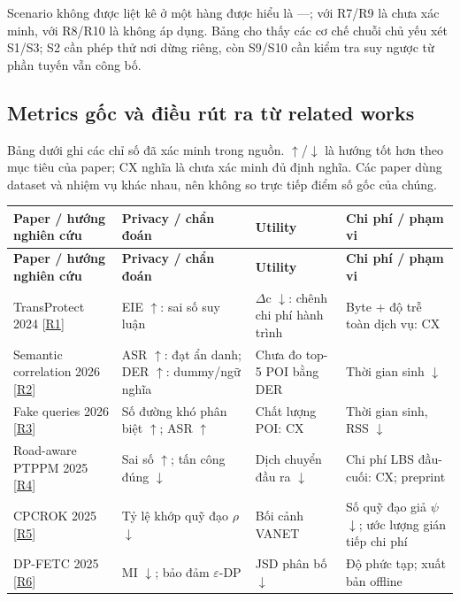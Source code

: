 \documentclass[10pt,a4paper]{article}
\begin{document}
\endgroup
Scenario không được liệt kê ở một hàng được hiểu là —; với R7/R9 là chưa xác minh, với R8/R10 là không áp dụng. Bảng cho thấy các cơ chế chuỗi chủ yếu xét S1/S3; S2 cần phép thử nơi dừng riêng, còn S9/S10 cần kiểm tra suy ngược từ phần tuyến vẫn công bố.


\clearpage
\subsection{Metrics gốc và điều rút ra từ related works}\label{sub:1.1}
Bảng dưới ghi các chỉ số đã xác minh trong nguồn. $\uparrow$/$\downarrow$ là hướng tốt hơn theo mục tiêu của paper; CX nghĩa là chưa xác minh đủ định nghĩa. Các paper dùng dataset và nhiệm vụ khác nhau, nên không so trực tiếp điểm số gốc của chúng.

\begingroup\small
\begin{longtable}{@{}P{3.871cm}P{4.355cm}P{3.871cm}P{4.258cm}@{}}
\toprule
\textbf{Paper / hướng nghiên cứu} & \textbf{Privacy / chẩn đoán} & \textbf{Utility} & \textbf{Chi phí / phạm vi}\\\midrule
\endfirsthead
\toprule
\textbf{Paper / hướng nghiên cứu} & \textbf{Privacy / chẩn đoán} & \textbf{Utility} & \textbf{Chi phí / phạm vi}\\\midrule
\endhead
\bottomrule\endfoot
TransProtect 2024 [\hyperlink{ref-R1}{R1}] & EIE $\uparrow$: sai số suy luận & $\Delta$c $\downarrow$: chênh chi phí hành trình & Byte + độ trễ toàn dịch vụ: CX\\
\addlinespace[3pt]
Semantic correlation 2026 [\hyperlink{ref-R2}{R2}] & ASR $\uparrow$: đạt ẩn danh; DER $\uparrow$: dummy/ngữ nghĩa & Chưa đo top-5 POI bằng DER & Thời gian sinh $\downarrow$\\
\addlinespace[3pt]
Fake queries 2026 [\hyperlink{ref-R3}{R3}] & Số đường khó phân biệt $\uparrow$; ASR $\uparrow$ & Chất lượng POI: CX & Thời gian sinh, RSS $\downarrow$\\
\addlinespace[3pt]
Road-aware PTPPM 2025 [\hyperlink{ref-R4}{R4}] & Sai số $\uparrow$; tấn công đúng $\downarrow$ & Dịch chuyển đầu ra $\downarrow$ & Chi phí LBS đầu-cuối: CX; preprint\\
\addlinespace[3pt]
CPCROK 2025 [\hyperlink{ref-R5}{R5}] & Tỷ lệ khớp quỹ đạo $\rho$ $\downarrow$ & Bối cảnh VANET & Số quỹ đạo giả $\psi$ $\downarrow$; ước lượng gián tiếp chi phí\\
\addlinespace[3pt]
DP-FETC 2025 [\hyperlink{ref-R6}{R6}] & MI $\downarrow$; bảo đảm $\varepsilon$-DP & JSD phân bố $\downarrow$ & Độ phức tạp; xuất bản offline\\

\end{longtable}
\end{document}
